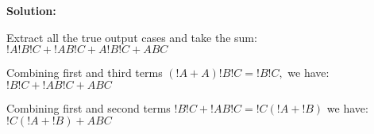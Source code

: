 \textbf{Solution:}

\noindent
Extract all the true output cases and take the sum:
$
!A !B !C +
!A  B !C +
 A !B !C +
 A  B  C
$

\noindent
Combining first and third terms
$
(!A + A) !B !C = !B !C,
$
we have:
$
!B !C +
!A  B !C +
 A  B  C
$

\noindent
Combining first and second terms
$
!B !C +
!A  B !C = !C(!A + !B)
$
we have:
$
!C(!A + !B) +
 A  B  C
$

